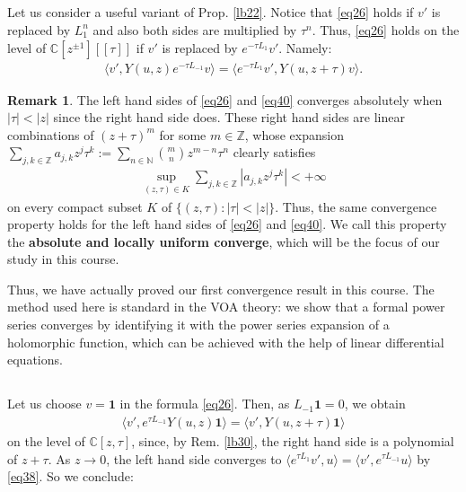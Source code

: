 \documentclass[12pt,a4paper,notitlepage]{article}
\theoremstyle{definition}
\newtheorem{rem}[df]{Remark}
\theoremstyle{plain}
\newcommand{\id}{\mathbf{1}}
\newcommand{\bigbk}[1]{\big\langle {#1}\big\rangle}
\newcommand{\Cbb}{\mathbb C}
\newcommand{\Nbb}{\mathbb N}
\newcommand{\Zbb}{\mathbb Z}
\numberwithin{equation}{section}
\begin{document}
\subsection{}


Let us consider a useful  variant of Prop. \ref{lb22}. Notice that  \eqref{eq26} holds if $v'$ is replaced by $L_1^n$ and also both sides are multiplied by $\tau^n$. Thus, \eqref{eq26} holds on the level of $\Cbb[z^{\pm1}][[\tau]]$ if $v'$ is replaced by $e^{-\tau L_1}v'$. Namely:
\begin{align}
	\bigbk{v',Y(u,z)e^{-\tau L_{-1}}v}=\bigbk{e^{-\tau L_1}v',Y(u,z+\tau)v}.\label{eq40}
\end{align}

\begin{rem}
The left hand sides of \eqref{eq26} and \eqref{eq40} converges absolutely when $|\tau|<|z|$ since the right hand side does. These right hand sides are  linear combinations of $(z+\tau)^m$ for some $m\in\Zbb$, whose expansion $\sum_{j,k\in\Zbb}a_{j,k}z^j\tau^k:=\sum_{n\in\Nbb}{m\choose n}z^{m-n}\tau^n$ clearly satisfies
\begin{align}
\sup_{(z,\tau)\in K}	\sum_{j,k\in\Zbb}|a_{j,k}z^j\tau^k|<+\infty
\end{align}
on every compact subset $K$ of $\{(z,\tau):|\tau|<|z|\}$. Thus, the same convergence property holds for the left hand sides of \eqref{eq26} and \eqref{eq40}. We call this property the \textbf{absolute and locally uniform converge}, which will be the focus of our study in this course.
\end{rem}


Thus, we have actually proved our first convergence result in this course. The method used here is standard in the VOA theory: we show that a formal power series converges by identifying it with the power series expansion of a holomorphic function, which can be achieved with the help of linear differential equations.





\subsection{}

Let us choose $v=\id$ in the formula \eqref{eq26}. Then, as $L_{-1}\id=0$, we obtain
\begin{align}
	\bigbk{v',e^{\tau L_{-1}}Y(u,z)\id}=\bigbk{v',Y(u,z+\tau)\id}\label{eq39}
\end{align}
on the level of $\Cbb[z,\tau]$, since, by Rem. \ref{lb30},  the right hand side is a polynomial of $z+\tau$.  As $z\rightarrow 0$, the left hand side converges to $\bigbk{e^{\tau L_1}v',u}=\bigbk{v',e^{\tau L_{-1}}u}$ by \eqref{eq38}. So we conclude:
\end{document}
